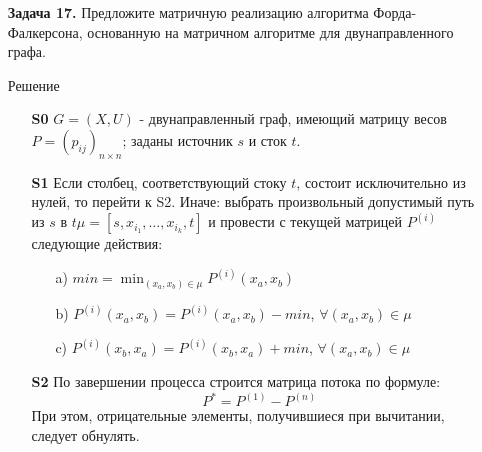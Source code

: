 \documentclass{article}
\begin{document}
\clearpage%
\begin{enumerate}
\item[\textbf{Задача 17.}]Предложите матричную реализацию алгоритма Форда-Фалкерсона, основанную на матричном алгоритме для двунаправленного графа.
\\
\begin{center}
Решение 
\end{center}
\begin{enumerate}
    \item[\textbf{S0}] $G = (X,U)$ - двунаправленный граф, имеющий матрицу весов $P = (p_{ij})_{n\times n}$; заданы источник $s$ и сток $t$.
    \item[\textbf{S1}] Если столбец, соответствующий стоку $t$, состоит исключительно из нулей, то перейти к S2. Иначе: выбрать произвольный допустимый путь из $s$ в $t$\quad\textemdash\quad $\mu = [s, x_{i_1}, \dots, x_{i_k}, t]$ и провести с текущей матрицей $P^{(i)}$ следующие действия: 
        \begin{enumerate}
            \item[a)] $min = \min_{(x_a,x_b) \in \mu} P^{(i)}(x_a,x_b)$
            \item[b)] $P^{(i)}(x_a,x_b) = P^{(i)}(x_a,x_b) - min$, $\forall (x_a,x_b) \in \mu$
            \item[c)] $P^{(i)}(x_b,x_a) = P^{(i)}(x_b,x_a) + min$, $\forall (x_a,x_b) \in \mu$
        \end{enumerate}
    \item[\textbf{S2}] По завершении процесса строится матрица потока по формуле:    $$P^* = P^{(1)} - P^{(n)}$$
    При этом, отрицательные элементы, получившиеся при вычитании, следует обнулять.
    \end{enumerate}
\end{enumerate}
\end{document}
